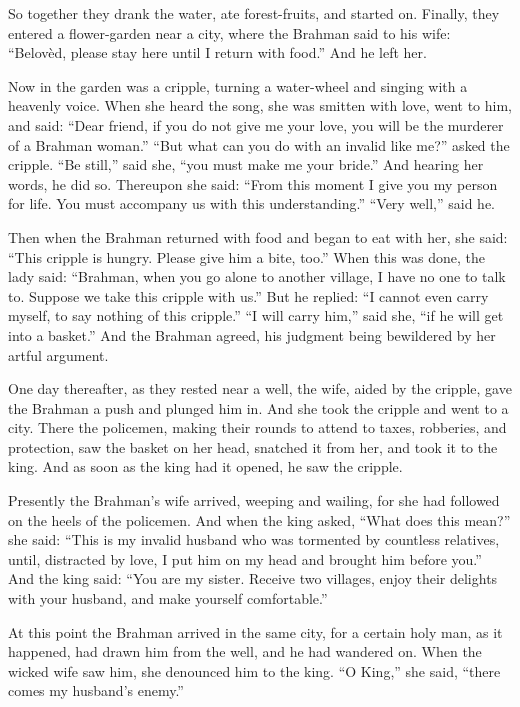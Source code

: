 \documentclass[article, twoside, 14pt]{memoir}
\begin{document}
So together they drank the water, ate forest-fruits, and started
on. Finally, they entered a flower-garden near a city, where the
Brahman said to his wife:
``Belovèd, please stay here until I return with food.'' And he left
her.

Now in the garden was a cripple, turning a water-wheel and singing
with a heavenly voice. When she heard the song, she was smitten
with love, went to him, and said:
``Dear friend, if you do not give me your love, you will be the murderer of a Brahman woman.''
``But what can you do with an invalid like me?'' asked the cripple.
``Be still,'' said she, ``you must make me your bride.'' And
hearing her words, he did so. Thereupon she said:
``From this moment I give you my person for life. You must accompany us with this understanding.''
``Very well,'' said he.

Then when the Brahman returned with food and began to eat with her,
she said: ``This cripple is hungry. Please give him a bite, too.''
When this was done, the lady said:
``Brahman, when you go alone to another village, I have no one to talk to. Suppose we take this cripple with us.''
But he replied:
``I cannot even carry myself, to say nothing of this cripple.''
``I will carry him,'' said she, ``if he will get into a basket.''
And the Brahman agreed, his judgment being bewildered by her artful
argument.

One day thereafter, as they rested near a well, the wife, aided by
the cripple, gave the Brahman a push and plunged him in. And she
took the cripple and went to a city. There the policemen, making
their rounds to attend to taxes, robberies, and protection, saw the
basket on her head, snatched it from her, and took it to the king.
And as soon as the king had it opened, he saw the cripple.

Presently the Brahman's wife arrived, weeping and wailing, for she
had followed on the heels of the policemen. And when the king
asked, ``What does this mean?'' she said:
``This is my invalid husband who was tormented by countless relatives, until, distracted by love, I put him on my head and brought him before you.''
And the king said:
``You are my sister. Receive two villages, enjoy their delights with your husband, and make yourself comfortable.''

At this point the Brahman arrived in the same city, for a certain
holy man, as it happened, had drawn him from the well, and he had
wandered on. When the wicked wife saw him, she denounced him to the
king. ``O King,'' she said,
``there comes my husband's enemy.''
\end{document}
